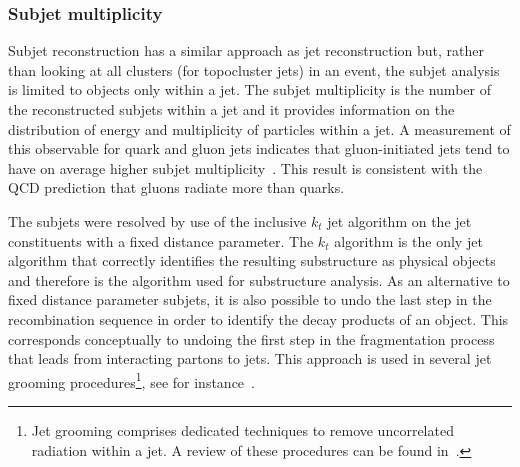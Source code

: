\subsubsection{Subjet multiplicity} 


Subjet reconstruction has a similar approach as jet reconstruction but, rather than looking at all clusters (for topocluster jets) in an event, the subjet analysis is limited to objects only within a jet.  The subjet multiplicity is the number of the reconstructed subjets within a jet and it provides information on the distribution of energy and multiplicity of particles within a jet.  A measurement of this observable for quark and gluon jets indicates that gluon-initiated jets tend to have on average higher subjet multiplicity~\cite{Snihur1999494}. %
This result is consistent with the QCD prediction that gluons radiate more than quarks.  %

The subjets were resolved by use of the inclusive $k_t$ jet algorithm on the jet constituents with a fixed distance parameter. The $k_t$ algorithm is the only jet algorithm that correctly identifies the resulting substructure as physical objects and therefore is the algorithm used for substructure analysis.
As an alternative to fixed distance parameter subjets, it is also possible to undo the last step in the recombination sequence in order to identify the decay products of an object. This corresponds conceptually to undoing the first step in the fragmentation process that leads from interacting partons to jets.  This approach is used in several jet grooming procedures\footnote{Jet grooming comprises dedicated techniques to remove uncorrelated radiation within a jet. A review of these procedures can be found in~\cite{Abdesselam:2010pt}. }, see for instance~\cite{pruning}.

